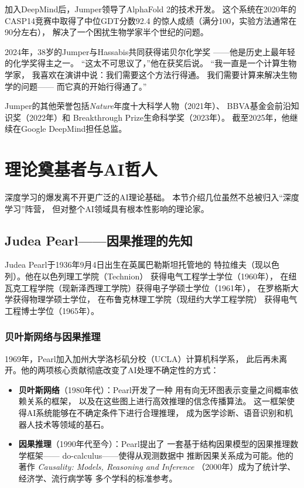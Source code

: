 加入DeepMind后，Jumper领导了AlphaFold 2的技术开发。
这个系统在2020年的CASP14竞赛中取得了中位GDT分数92.4
的惊人成绩（满分100，实验方法通常在90分左右），
解决了一个困扰生物学家半个世纪的问题。

2024年，38岁的Jumper与Hassabis共同获得诺贝尔化学奖
——他是历史上最年轻的化学奖得主之一。
``这太不可思议了，''他在获奖后说。
``我一直是一个计算生物学家，
我喜欢在演讲中说：我们需要这个方法行得通。
我们需要计算来解决生物学的问题——
而它真的开始行得通了。''

Jumper的其他荣誉包括\textit{Nature}年度十大科学人物（2021年）、
BBVA基金会前沿知识奖（2022年）和
Breakthrough Prize生命科学奖（2023年）。
截至2025年，他继续在Google DeepMind担任总监。


\section{理论奠基者与AI哲人}
\label{sec:theorists}

深度学习的爆发离不开更广泛的AI理论基础。
本节介绍几位虽然不总被归入``深度学习''阵营，
但对整个AI领域具有根本性影响的理论家。

\subsection{Judea Pearl——因果推理的先知}
\label{sec:pearl}

Judea Pearl于1936年9月4日出生在英属巴勒斯坦托管地的
特拉维夫（现以色列）。他在以色列理工学院（Technion）
获得电气工程学士学位（1960年），
在纽瓦克工程学院（现新泽西理工学院）获得电子学硕士学位（1961年），
在罗格斯大学获得物理学硕士学位，
在布鲁克林理工学院（现纽约大学工程学院）
获得电气工程博士学位（1965年）。

\subsubsection{贝叶斯网络与因果推理}
1969年，Pearl加入加州大学洛杉矶分校（UCLA）计算机科学系，
此后再未离开。他的两项核心贡献彻底改变了AI处理不确定性的方式：

\begin{itemize}[noitemsep]
  \item \textbf{贝叶斯网络}（1980年代）：Pearl开发了一种
    用有向无环图表示变量之间概率依赖关系的框架，
    以及在这些图上进行高效推理的信念传播算法。
    这一框架使得AI系统能够在不确定条件下进行合理推理，
    成为医学诊断、语音识别和机器人技术等领域的基石。
  \item \textbf{因果推理}（1990年代至今）：Pearl提出了
    一套基于结构因果模型的因果推理数学框架——
    do-calculus——使得从观测数据中
    推断因果关系成为可能。他的著作
    \textit{Causality: Models, Reasoning and Inference}
    （2000年）成为了统计学、经济学、流行病学等
    多个学科的标准参考。
\end{itemize}

